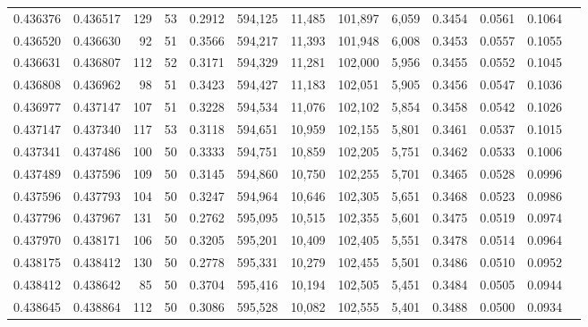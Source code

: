 \begin{tabular}{rrrrrrrrrrrrr}
0.436376 & 0.436517 &   129 &  53 &                                     0.2912 & 594,125 &  11,485 & 101,897 &   6,059 & 0.3454 & 0.0561 & 0.1064 \\
0.436520 & 0.436630 &    92 &  51 &                                     0.3566 & 594,217 &  11,393 & 101,948 &   6,008 & 0.3453 & 0.0557 & 0.1055 \\
0.436631 & 0.436807 &   112 &  52 &                                     0.3171 & 594,329 &  11,281 & 102,000 &   5,956 & 0.3455 & 0.0552 & 0.1045 \\
0.436808 & 0.436962 &    98 &  51 &                                     0.3423 & 594,427 &  11,183 & 102,051 &   5,905 & 0.3456 & 0.0547 & 0.1036 \\
0.436977 & 0.437147 &   107 &  51 &                                     0.3228 & 594,534 &  11,076 & 102,102 &   5,854 & 0.3458 & 0.0542 & 0.1026 \\
0.437147 & 0.437340 &   117 &  53 &                                     0.3118 & 594,651 &  10,959 & 102,155 &   5,801 & 0.3461 & 0.0537 & 0.1015 \\
0.437341 & 0.437486 &   100 &  50 &                                     0.3333 & 594,751 &  10,859 & 102,205 &   5,751 & 0.3462 & 0.0533 & 0.1006 \\
0.437489 & 0.437596 &   109 &  50 &                                     0.3145 & 594,860 &  10,750 & 102,255 &   5,701 & 0.3465 & 0.0528 & 0.0996 \\
0.437596 & 0.437793 &   104 &  50 &                                     0.3247 & 594,964 &  10,646 & 102,305 &   5,651 & 0.3468 & 0.0523 & 0.0986 \\
0.437796 & 0.437967 &   131 &  50 &                                     0.2762 & 595,095 &  10,515 & 102,355 &   5,601 & 0.3475 & 0.0519 & 0.0974 \\
0.437970 & 0.438171 &   106 &  50 &                                     0.3205 & 595,201 &  10,409 & 102,405 &   5,551 & 0.3478 & 0.0514 & 0.0964 \\
0.438175 & 0.438412 &   130 &  50 &                                     0.2778 & 595,331 &  10,279 & 102,455 &   5,501 & 0.3486 & 0.0510 & 0.0952 \\
0.438412 & 0.438642 &    85 &  50 &                                     0.3704 & 595,416 &  10,194 & 102,505 &   5,451 & 0.3484 & 0.0505 & 0.0944 \\
0.438645 & 0.438864 &   112 &  50 &                                     0.3086 & 595,528 &  10,082 & 102,555 &   5,401 & 0.3488 & 0.0500 & 0.0934 \\

\end{tabular}
